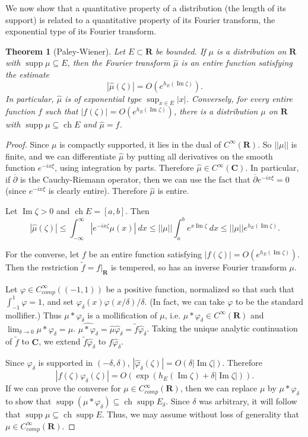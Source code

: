 \documentclass[12pt]{report}
\newcommand{\RR}{\mathbf{R}}
\newcommand{\CC}{\mathbf{C}}
\DeclareMathOperator{\ch}{ch}
\DeclareMathOperator{\supp}{supp}
\newcommand{\dbar}{\overline \partial}
\renewcommand{\Im}{\operatorname{Im}}
\newtheorem{theorem}{Theorem}[chapter]
\theoremstyle{definition}
\begin{document}
We now show that a quantitative property of a distribution (the length of its support) is related to a quantitative property of its Fourier transform, the exponential type of its Fourier transform.
\begin{theorem}[Paley-Wiener]
\label{PWS theorem}
    Let $E \subset \RR$ be bounded. If $\mu$ is a distribution on $\RR$ with $\supp \mu \subseteq E$, then the Fourier transform $\hat \mu$ is an entire function satisfying the estimate
$$|\hat \mu(\zeta)| = O(e^{h_E(\Im \zeta)}).$$
    In particular, $\hat \mu$ is of exponential type $\sup_{x \in E} |x|$.
    Conversely, for every entire function $f$ such that $|f(\zeta)| = O(e^{h_E(\Im \zeta)})$, there is a distribution $\mu$ on $\RR$ with $\supp \mu \subseteq \ch E$ and $\hat \mu = f$.
\end{theorem}
\begin{proof}
    Since $\mu$ is compactly supported, it lies in the dual of $C^\infty(\RR)$. So $||\mu||$ is finite, and we can differentiate $\hat \mu$ by putting all derivatives on the smooth function $e^{-ix\xi}$, using integration by parts. Therefore $\hat \mu \in C^\infty(\CC)$. In particular, if $\dbar$ is the Cauchy-Riemann operator, then we can use the fact that $\dbar e^{-ix\xi} = 0$ (since $e^{-i x\xi}$ is clearly entire). Therefore $\hat \mu$ is entire.

    Let $\Im \zeta > 0$ and $\ch E = [a, b]$. Then
$$|\hat \mu(\zeta)| \leq \int_{-\infty}^\infty |e^{-ix\zeta} \mu(x)| ~dx \leq ||\mu|| \int_a^b e^{x \Im \zeta} ~dx \leq ||\mu|| e^{h_E(\Im \zeta)}.$$

    For the converse, let $f$ be an entire function satisfying $|f(\zeta)| = O(e^{h_E(\Im \zeta)})$. Then the restriction $\tilde f = f|_\RR$ is tempered, so has an inverse Fourier transform $\mu$.

    Let $\varphi \in C^\infty_{comp}((-1, 1))$ be a positive function, normalized so that such that $\int_{-1}^1 \varphi = 1$, and set $\varphi_\delta(x) \varphi(x/\delta)/\delta$. (In fact, we can take $\varphi$ to be the standard mollifier.)
    Thus $\mu * \varphi_\delta$ is a mollification of $\mu$, i.e.
    $\mu * \varphi_\delta \in C^\infty(\RR)$ and $\lim_{\delta \to 0} \mu * \varphi_\delta = \mu$. $\widehat{\mu*\varphi_\delta} = \hat \mu  \hat \varphi_\delta = \tilde f \hat \varphi_\delta$.
    Taking the unique analytic continuation of $\tilde f$ to $\CC$, we extend $\tilde f \hat \varphi_\delta$ to $f \hat \varphi_\delta$.

    Since $\varphi_\delta$ is supported in $(-\delta, \delta)$, $|\hat \varphi_\delta(\zeta)| = O(\delta |\Im \zeta|)$. Therefore
$$|f(\zeta) \varphi_\delta(\zeta)| = O(\exp(h_E(\Im \zeta) + \delta|\Im \zeta|)).$$
    If we can prove the converse for $\mu \in C^\infty_{comp}(\RR)$, then we can replace $\mu$ by $\mu * \varphi_\delta$ to show that $\supp (\mu * \varphi_\delta) \subseteq \ch \supp E_\delta$. Since $\delta$ was arbitrary, it will follow that $\supp \mu \subseteq \ch \supp E$. Thus, we may assume without loss of generality that $\mu \in C^\infty_{comp}(\RR)$.


\end{proof}
\end{document}

